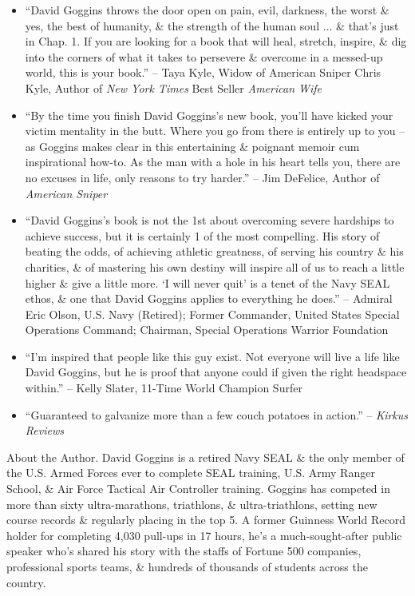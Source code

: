 \documentclass{article}
\begin{document}
\begin{enumerate}
\begin{itemize}
		\item ``{\sc David Goggins} throws the door open on pain, evil, darkness, the worst \& yes, the best of humanity, \& the strength of the human soul $\ldots$ \& that's just in Chap. 1. If you are looking for a book that will heal, stretch, inspire, \& dig into the corners of what it takes to persevere \& overcome in a messed-up world, this is your book.'' -- {\sc Taya Kyle}, Widow of American Sniper Chris Kyle, Author of {\it New York Times} Best Seller {\it American Wife}
		\item ``By the time you finish {\sc David Goggins}'s new book, you'll have kicked your victim mentality in the butt. Where you go from there is entirely up to you -- as {\sc Goggins} makes clear in this entertaining \& poignant memoir cum inspirational how-to. As the man with a hole in his heart tells you, there are no excuses in life, only reasons to try harder.'' -- {\sc Jim DeFelice}, Author of {\it American Sniper}
		\item ``{\sc David Goggins}'s book is not the 1st about overcoming severe hardships to achieve success, but it is certainly 1 of the most compelling. His story of beating the odds, of achieving athletic greatness, of serving his country \& his charities, \& of mastering his own destiny will inspire all of us to reach a little higher \& give a little more. `I will never quit' is a tenet of the Navy SEAL ethos, \& one that {\sc David Goggins} applies to everything he does.'' -- {\sc Admiral Eric Olson},  U.S. Navy (Retired); Former Commander, United States Special Operations Command; Chairman, Special Operations Warrior Foundation
		\item ``I'm inspired that people like this guy exist. Not everyone will live a life like {\sc David Goggins}, but he is proof that anyone could if given the right headspace within.'' -- {\sc Kelly Slater}, 11-Time World Champion Surfer
		\item ``Guaranteed to galvanize more than a few couch potatoes in action.'' -- {\it Kirkus Reviews}
	\end{itemize}
	{\sf About the Author.} {\sc David Goggins} is a retired Navy SEAL \& the only member of the U.S. Armed Forces ever to complete SEAL training, U.S. Army Ranger School, \& Air Force Tactical Air Controller training. {\sc Goggins} has competed in more than sixty ultra-marathons, triathlons, \& ultra-triathlons, setting new course records \& regularly placing in the top 5. A former Guinness World Record holder for completing 4,030 pull-ups in 17 hours, he's a much-sought-after public speaker who's shared his story with the staffs of Fortune 500 companies, professional sports teams, \& hundreds of thousands of students across the country.
	

\end{enumerate}
\end{document}
